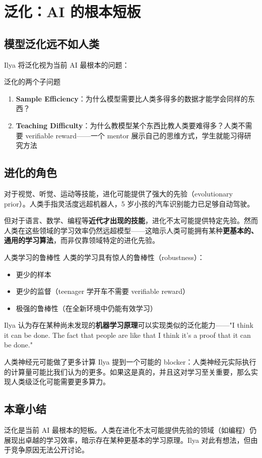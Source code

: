 \section{泛化：AI 的根本短板}

\subsection{模型泛化远不如人类}

Ilya 将泛化视为当前 AI 最根本的问题：

\begin{importantbox}{泛化的两个子问题}
\begin{enumerate}
    \item \textbf{Sample Efficiency}：为什么模型需要比人类多得多的数据才能学会同样的东西？
    \item \textbf{Teaching Difficulty}：为什么教模型某个东西比教人类要难得多？人类不需要 verifiable reward——一个 mentor 展示自己的思维方式，学生就能习得研究方法
\end{enumerate}
\end{importantbox}

\subsection{进化的角色}

对于视觉、听觉、运动等技能，进化可能提供了强大的先验（evolutionary prior）。人类手指灵活度远超机器人，5 岁小孩的汽车识别能力已足够自动驾驶。

但对于语言、数学、编程等\textbf{近代才出现的技能}，进化不太可能提供特定先验。然而人类在这些领域的学习效率仍然远超模型——这暗示人类可能拥有某种\textbf{更基本的、通用的学习算法}，而非仅靠领域特定的进化先验。

\begin{importantbox}{人类学习的鲁棒性}
人类的学习具有惊人的鲁棒性（robustness）：
\begin{itemize}
    \item 更少的样本
    \item 更少的监督（teenager 学开车不需要 verifiable reward）
    \item 极强的鲁棒性（在全新环境中仍能有效学习）
\end{itemize}
Ilya 认为存在某种尚未发现的\textbf{机器学习原理}可以实现类似的泛化能力——"I think it can be done. The fact that people are like that I think it's a proof that it can be done."
\end{importantbox}

\begin{knowledgebox}{人类神经元可能做了更多计算}
Ilya 提到一个可能的 blocker：人类神经元实际执行的计算量可能比我们认为的更多。如果这是真的，并且这对学习至关重要，那么实现人类级泛化可能需要更多算力。
\end{knowledgebox}

\subsection{本章小结}

泛化是当前 AI 最根本的短板。人类在进化不太可能提供先验的领域（如编程）仍展现出卓越的学习效率，暗示存在某种更基本的学习原理。Ilya 对此有想法，但由于竞争原因无法公开讨论。


